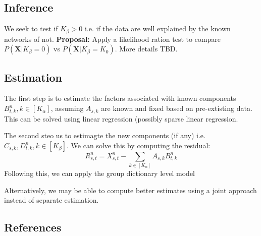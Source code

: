 \documentclass{article}
\begin{document}
\subsection{Inference}
We seek to test if $K_\beta >0$ i.e. if the data are well explained by the known networks of not. {\bf Proposal:} Apply a likelihood ration test to compare $P(\mathbf{X}|K_\beta=0)$ vs $P(\mathbf{X}|K_\beta=K_0)$. More details TBD.

\subsection{Estimation}
The first step is to estimate the factors associated with known components $B^n_{t, k}, {k \in [K_\alpha]}$, assuming $A_{s, k}$ are known and fixed based on pre-extisting data. This can be solved using linear regression (possibly sparse linear regression.

The second steo us to estimagte the new components (if any) i.e. $C_{s, k}, D^n_{t, k}, {k \in [K_\beta]}$. We can solve this by computing the residual:
$$R^{n}_{s,t} =  X^{n}_{s,t} - \sum_{k \in [K_\alpha]} A_{s, k} B^n_{t, k} $$
Following this, we can apply the group dictionary level model 

Alternatively, we may be able to compute better estimates using a joint approach instead of separate estimation.
\newpage
\subsection*{References}


\end{document}
